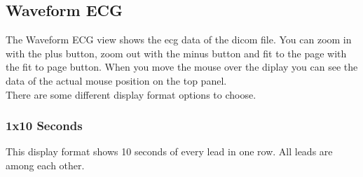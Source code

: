 	\begin{minipage}{\textwidth} 
	\centering
	\label{fig:bild}
	\end{minipage}
	
	\subsection{Waveform ECG}
	The Waveform ECG view shows the ecg data of the dicom file. You can zoom in
	with the plus button, zoom out with the minus button and fit to the page with
	the fit to page button. When you move the mouse over the diplay you can see the
	data of the actual mouse position on the top panel. \\
	There are some different display format options to choose.\\
		
	\begin{minipage}{\textwidth} 
	\centering
	\label{fig:bild}
	\end{minipage}
	
		\subsubsection{1x10 Seconds}
		This display format shows 10 seconds of every lead in one row. All leads are
		among each other.
		
